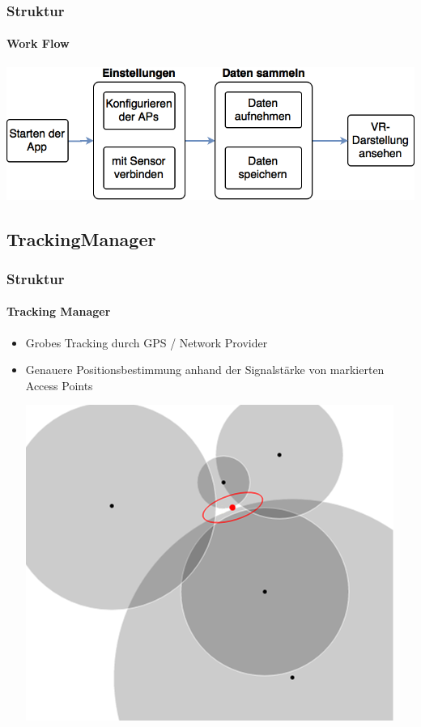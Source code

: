 \documentclass{beamer}
\begin{document}
\begin{frame}
\frametitle{Struktur}
\framesubtitle{Work Flow}
	\includegraphics[width=\textwidth]{diagram/workflow.png}
\end{frame}

\subsection{TrackingManager}

\begin{frame}
\frametitle{Struktur}
\framesubtitle{Tracking Manager}
\begin{itemize}
  	\item	Grobes Tracking durch GPS / Network Provider \pause
 	\item 	Genauere Positionsbestimmung anhand der Signalstärke von markierten Access Points
			\begin{center}
			\includegraphics[scale=0.5]{trilateration.png}
			\end{center}
\end{itemize}
\end{frame}
\end{document}
